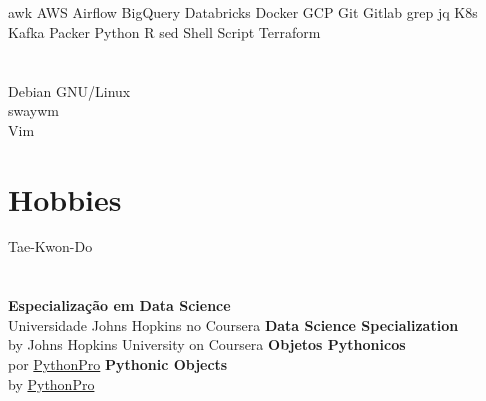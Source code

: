\documentclass[]{friggeri-cv}
\begin{document}
\begin{aside}
%
%
%
  \section{}
    awk
    AWS
    Airflow
    BigQuery
    Databricks
    Docker
    GCP
    Git
    Gitlab
    grep
    jq
    K8s
    Kafka
    Packer
    Python
    R
    sed
    Shell Script
    Terraform
%
  \section{}
    Debian GNU/Linux \\%
    swaywm \\%
    Vim
%
  \section{Hobbies}
      \href{https://olhares.com/diraol}{}
      Tae-Kwon-Do
%
  \section{}
      {\textbf{Especialização em Data Science}\\{\scriptsize{Universidade Johns Hopkins no Coursera}}}%
      {\textbf{Data Science Specialization}\\{\scriptsize{by Johns Hopkins University on Coursera}}}
%
      {\textbf{Objetos Pythonicos}\\{\scriptsize{por \href{https://www.python.pro.br/modulos/}{PythonPro}}}}%
      {\textbf{Pythonic Objects}\\{\scriptsize{by \href{https://www.python.pro.br/modulos/}{PythonPro}}}}
\end{aside}
\end{document}
